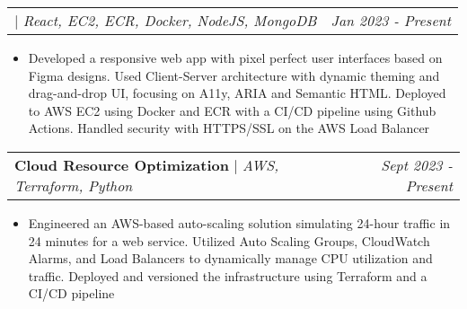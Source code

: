 \documentclass[letterpaper]{article}
\makeatletter
\newcommand{\resumeItemWithoutTitle}[1]{
  \item\small{
    {#1 \vspace{-2pt}}
  }
}
\newcommand{\projectHeading}[3]{
  \begin{tabular*}{\textwidth}{l@{\extracolsep{\fill}}r}
        \textbf{#1} 
        \hspace{-2pt} $\vert$ \hspace{-2pt} \small{\textit{#2}} 
        & 
        \textit{#3} \\
    \end{tabular*}\vspace{-2pt}
}
\newcommand{\projectHeadingWithLink}[4]{
  \begin{tabular*}{\textwidth}{l@{\extracolsep{\fill}}r}
        \textbf{\href{#4}{\color{blue}{#1}}}
        \hspace{-2pt} $\vert$ \hspace{-2pt} \small{\textit{#2}} 
        & 
        \textit{#3} \\
    \end{tabular*}\vspace{-2pt}
}
\newcommand{\resumeItemListStart}{\begin{itemize}}
\newcommand{\resumeItemListEnd}{\end{itemize}}
\makeatother
\begin{document}


\vspace{3pt}
\projectHeadingWithLink {Kanban Task Manager}{React, EC2, ECR, Docker, NodeJS, MongoDB}{Jan 2023 - Present}{https://www.kanbhan.com}
\resumeItemListStart
\resumeItemWithoutTitle{Developed a responsive web app with pixel perfect user interfaces based on Figma designs. Used Client-Server architecture with dynamic theming and drag-and-drop UI, focusing on A11y, ARIA and Semantic HTML. Deployed to AWS EC2 using Docker and ECR with a CI/CD pipeline using Github Actions. Handled security with HTTPS/SSL on the AWS Load Balancer}
\resumeItemListEnd






\vspace{3pt}
\projectHeading {Cloud Resource Optimization}{AWS, Terraform, Python}{Sept 2023 - Present}
\resumeItemListStart
\resumeItemWithoutTitle{Engineered an AWS-based auto-scaling solution simulating 24-hour traffic in 24 minutes for a web service. Utilized Auto Scaling Groups, CloudWatch Alarms, and Load Balancers to dynamically manage CPU utilization and traffic. Deployed and versioned the infrastructure using Terraform and a CI/CD pipeline}
\resumeItemListEnd


\end{document}
